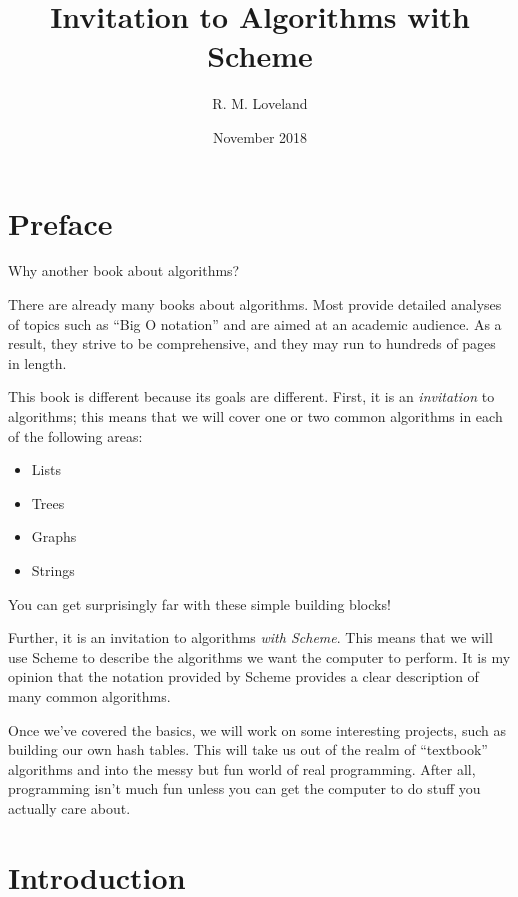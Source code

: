 \documentclass[12pt,openright,draft]{book}
\begin{document}
\title{Invitation to Algorithms with Scheme}
\author{R. M. Loveland}
\date{November 2018}

\frontmatter
\maketitle

\tableofcontents{}

\chapter{Preface}

Why another book about algorithms?

There are already many books about algorithms.  Most provide detailed
analyses of topics such as ``Big O notation'' and are aimed at an
academic audience.  As a result, they strive to be comprehensive, and
they may run to hundreds of pages in length.

This book is different because its goals are different.  First, it is
an \emph{invitation} to algorithms; this means that we will cover one or
two common algorithms in each of the following areas:

\begin{itemize}
\item Lists
\item Trees
\item Graphs
\item Strings
\end{itemize}

You can get surprisingly far with these simple building blocks!

Further, it is an invitation to algorithms \emph{with Scheme}.  This
means that we will use Scheme to describe the algorithms we want the
computer to perform.  It is my opinion that the notation provided by
Scheme provides a clear description of many common algorithms.

Once we've covered the basics, we will work on some interesting
projects, such as building our own hash tables.  This will take us out
of the realm of ``textbook'' algorithms and into the messy but fun world
of real programming.  After all, programming isn't much fun unless you
can get the computer to do stuff you actually care about.

\chapter{Introduction}
\end{document}
